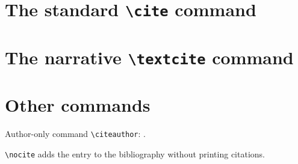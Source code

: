 \documentclass{article}
\newcommand\cs[1]{\texttt{\textbackslash #1}}
\begin{document}
\section*{The standard \cs{cite} command}

\cite{ITEM-1}

\cite{ITEM-1, ITEM-2}

\cite[page = 42]{ITEM-1}

\cite[prefix = {see }]{ITEM-1}

\cite[prefix = {see }, page = 42--73]{ITEM-1}


\section*{The narrative \cs{textcite} command}

\textcite{ITEM-1}

\textcite[page = 42]{ITEM-1}

\textcite[infix = {'s early work}]{ITEM-1}

\textcite[prefix = {see }]{ITEM-1}

\textcite[prefix = {see }, page = 42--73]{ITEM-1}


\section*{Other commands}

Author-only command \cs{citeauthor}: \citeauthor{ITEM-1}.

\cs{nocite} adds the entry to the bibliography without printing citations.\nocite{ITEM-3}

\printbibliography
\end{document}
